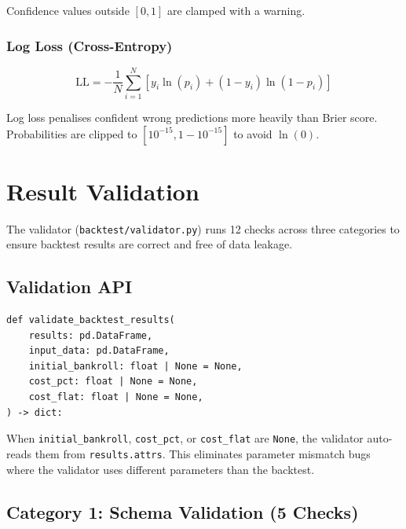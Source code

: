 \documentclass[12pt,a4paper]{report}
\theoremstyle{definition}
\newcommand{\code}[1]{\texttt{#1}}
\newcommand{\file}[1]{\texttt{#1}}
\begin{document}
Confidence values outside $[0, 1]$ are clamped with a warning.

\subsection{Log Loss (Cross-Entropy)}
\label{sec:logloss}

\begin{equation}
    \text{LL} = -\frac{1}{N} \sum_{i=1}^{N} \left[y_i \ln(p_i) + (1 - y_i) \ln(1 - p_i)\right]
    \label{eq:logloss}
\end{equation}

Log loss penalises confident wrong predictions more heavily than Brier score. Probabilities are clipped to $[10^{-15}, 1 - 10^{-15}]$ to avoid $\ln(0)$.


\chapter{Result Validation}
\label{ch:validation}

The validator (\file{backtest/validator.py}) runs 12 checks across three categories to ensure backtest results are correct and free of data leakage.

\section{Validation API}

\begin{lstlisting}[caption={Validator function signature.}]
def validate_backtest_results(
    results: pd.DataFrame,
    input_data: pd.DataFrame,
    initial_bankroll: float | None = None,
    cost_pct: float | None = None,
    cost_flat: float | None = None,
) -> dict:
\end{lstlisting}

When \code{initial\_bankroll}, \code{cost\_pct}, or \code{cost\_flat} are \code{None}, the validator auto-reads them from \code{results.attrs}. This eliminates parameter mismatch bugs where the validator uses different parameters than the backtest.

\section{Category 1: Schema Validation (5 Checks)}
\end{document}
